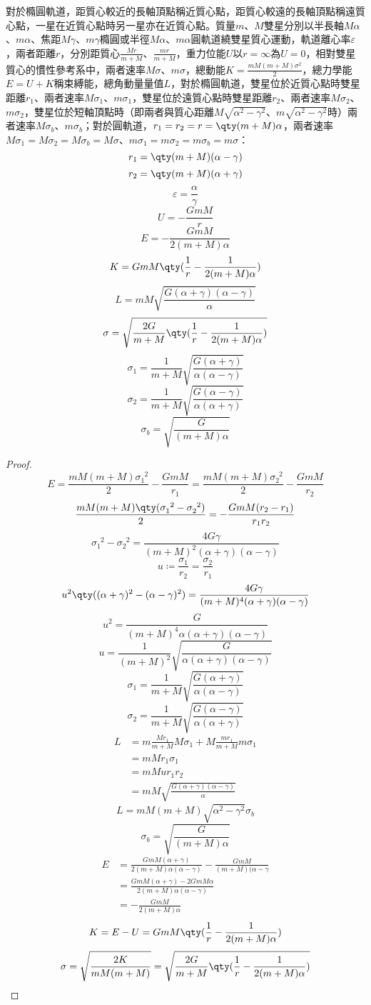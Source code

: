 \documentclass[a4paper,12pt]{article}
\begin{document}
對於橢圓軌道，距質心較近的長軸頂點稱近質心點，距質心較遠的長軸頂點稱遠質心點，一星在近質心點時另一星亦在近質心點。質量$m$、$M$雙星分別以半長軸$M\alpha$、$m\alpha$、焦距$M\gamma$、$m\gamma$橢圓或半徑$M\alpha$、$m\alpha$圓軌道繞雙星質心運動，軌道離心率$\varepsilon$，兩者距離$r$，分別距質心$\frac{Mr}{m+M}$、$\frac{mr}{m+M}$，重力位能$U$以$r=\infty$為$U=0$，相對雙星質心的慣性參考系中，兩者速率$M\sigma$、$m\sigma$，總動能$K=\frac{mM(m+M)\sigma^2}{2}$，總力學能$E=U+K$稱束縛能，總角動量量值$L$，對於橢圓軌道，雙星位於近質心點時雙星距離$r_1$、兩者速率$M\sigma_1$、$m\sigma_1$，雙星位於遠質心點時雙星距離$r_2$、兩者速率$M\sigma_2$、$m\sigma_2$，雙星位於短軸頂點時（即兩者與質心距離$M\sqrt{\alpha^2-\gamma^2}$、$m\sqrt{\alpha^2-\gamma^2}$時）兩者速率$M\sigma_b$、$m\sigma_b$；對於圓軌道，$r_1=r_2=r=\qty(m+M)\alpha$，兩者速率$M\sigma_1=M\sigma_2=M\sigma_b=M\sigma$、$m\sigma_1=m\sigma_2=m\sigma_b=m\sigma$：
\[r_1=\qty(m+M)(\alpha-\gamma)\]
\[r_2=\qty(m+M)(\alpha+\gamma)\]
\[\varepsilon=\frac{\alpha}{\gamma}\]
\[U=-\frac{GmM}{r}\]
\[E=-\frac{GmM}{2(m+M)\alpha}\]
\[K=GmM\qty(\frac{1}{r}-\frac{1}{2(m+M)\alpha})\]
\[L=mM\sqrt{\frac{G(\alpha+\gamma)(\alpha-\gamma)}{\alpha}}\]
\[\sigma=\sqrt{\frac{2G}{m+M}\qty(\frac{1}{r}-\frac{1}{2(m+M)\alpha})}\]
\[\sigma_1=\frac{1}{m+M}\sqrt{\frac{G(\alpha+\gamma)}{\alpha(\alpha-\gamma)}}\]
\[\sigma_2=\frac{1}{m+M}\sqrt{\frac{G(\alpha-\gamma)}{\alpha(\alpha+\gamma)}}\]
\[\sigma_b=\sqrt{\frac{G}{(m+M)\alpha}}\]
\begin{proof}
\[E=\frac{mM(m+M)\sigma_1^{\phantom{1}2}}{2}-\frac{GmM}{r_1}=\frac{mM(m+M)\sigma_2^{\phantom{2}2}}{2}-\frac{GmM}{r_2}\]
\[\frac{mM(m+M)\qty(\sigma_1^{\phantom{1}2}-\sigma_2^{\phantom{2}2})}{2}=-\frac{GmM(r_2-r_1)}{r_1r_2}\]
\[\sigma_1^{\phantom{1}2}-\sigma_2^{\phantom{2}2}=\frac{4G\gamma}{(m+M)^2(\alpha+\gamma)(\alpha-\gamma)}\]
\[u\coloneq\frac{\sigma_1}{r_2}=\frac{\sigma_2}{r_1}\]
\[u^2\qty((\alpha+\gamma)^2-(\alpha-\gamma)^2)=\frac{4G\gamma}{(m+M)^4(\alpha+\gamma)(\alpha-\gamma)}\]
\[u^2=\frac{G}{(m+M)^4\alpha(\alpha+\gamma)(\alpha-\gamma)}\]
\[u=\frac{1}{(m+M)^2}\sqrt{\frac{G}{\alpha(\alpha+\gamma)(\alpha-\gamma)}}\]
\[\sigma_1=\frac{1}{m+M}\sqrt{\frac{G(\alpha+\gamma)}{\alpha(\alpha-\gamma)}}\]
\[\sigma_2=\frac{1}{m+M}\sqrt{\frac{G(\alpha-\gamma)}{\alpha(\alpha+\gamma)}}\]
\[\begin{aligned}
L&=m\frac{Mr_1}{m+M}M\sigma_1+M\frac{mr_1}{m+M}m\sigma_1\\
&=mMr_1\sigma_1\\
&=mMur_1r_2\\
&=mM\sqrt{\frac{G(\alpha+\gamma)(\alpha-\gamma)}{\alpha}}
\end{aligned}\]
\[L=mM(m+M)\sqrt{\alpha^2-\gamma^2}\sigma_b\]
\[\sigma_b=\sqrt{\frac{G}{(m+M)\alpha}}\]
\[\begin{aligned}
E&=\frac{GmM(\alpha+\gamma)}{2(m+M)\alpha(\alpha-\gamma)}-\frac{GmM}{(m+M)(\alpha-\gamma}\\
&=\frac{GmM(\alpha+\gamma)-2GmM\alpha}{2(m+M)\alpha(\alpha-\gamma)}\\
&=-\frac{GmM}{2(m+M)\alpha}
\end{aligned}\]
\[K=E-U=GmM\qty(\frac{1}{r}-\frac{1}{2(m+M)\alpha})\]
\[\sigma=\sqrt{\frac{2K}{mM(m+M)}}=\sqrt{\frac{2G}{m+M}\qty(\frac{1}{r}-\frac{1}{2(m+M)\alpha})}\]
\end{proof}
\end{document}
